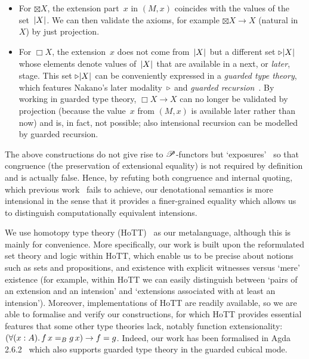 \documentclass[a4paper,UKenglish,numberwithinsect,cleveref,thm-restate,draft]{lipics-v2021}
\numberwithin{equation}{section}
\theoremstyle{definition}
\theoremstyle{plain}
\begin{document}
\begin{itemize}
    \item For $\boxtimes X$, the extension part~$x$ in $(M, x)$ coincides with the values of the set~$\mathopen{}\left|X\right|_{}^{}\mathclose{}$.
    We can then validate the \SFour axioms, for example $\boxtimes X \to X$ (natural in~$X$) by just projection.
    
    \item For $\Box X$, the extension~$x$ does not come from~$\mathopen{}\left|X\right|_{}^{}\mathclose{}$ but a different set $\mathord{\triangleright} \mathopen{}\left|X\right|_{}^{}\mathclose{}$ whose elements denote values of~$\mathopen{}\left|X\right|_{}^{}\mathclose{}$ that are available in a next, or \emph{later}, stage.
    This set $\mathord{\triangleright} \mathopen{}\left|X\right|_{}^{}\mathclose{}$ can be conveniently expressed in a \emph{guarded type theory}, which features Nakano's later modality~$\mathord{\triangleright}$ and \emph{guarded recursion}~\cite{Nakano2000}.
    By working in guarded type theory, $\Box X \to X$ can no longer be validated by projection (because the value~$x$ from $(M, x)$ is available later rather than now) and is, in fact, not possible; also intensional recursion can be modelled by guarded recursion.
\end{itemize}
The above constructions do not give rise to $\mathscr{P}$-functors but `exposures'~\cite{Kavvos2017b} so that congruence (the preservation of extensional equality) is not required by definition and is actually false.
Hence, by refuting both congruence and internal quoting, which previous work~\cite{Gabbay2013,Kavvos2017b} fails to achieve, our denotational semantics is more intensional in the sense that it provides a finer-grained equality which allows us to distinguish computationally equivalent intensions.%

We use homotopy type theory (HoTT)~\cite{hottbook} as our metalanguage, although this is mainly for convenience.
More specifically, our work is built upon the reformulated set theory and logic within HoTT, which enable us to be precise about notions such as sets and propositions, and existence with explicit witnesses versus `mere' existence (for example, within HoTT we can easily distinguish between `pairs of an extension and an intension' and `extensions associated with at least an intension').
Moreover, implementations of HoTT are readily available, so we are able to formalise and verify our constructions, for which HoTT provides essential features that some other type theories lack, notably function extensionality: $\left(\fall{x : A} f\,x =_B g\,x\right) \to f = g$.
Indeed, our work has been formalised in Agda 2.6.2~\cite{Agda} which also supports guarded type theory in the guarded cubical mode.
\end{document}
